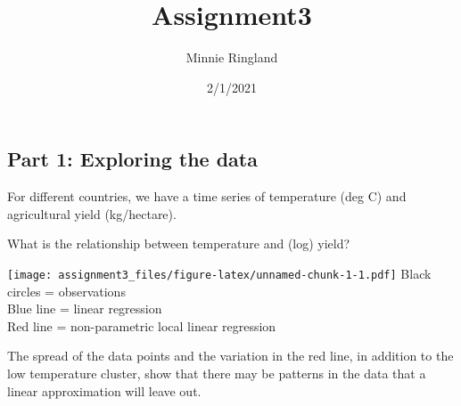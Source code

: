\documentclass[
]{article}
\title{Assignment3}
\author{Minnie Ringland}
\date{2/1/2021}
\newenvironment{Shaded}{\begin{snugshade}}{\end{snugshade}}
\newcommand{\AttributeTok}[1]{\textcolor[rgb]{0.77,0.63,0.00}{#1}}
\newcommand{\CommentTok}[1]{\textcolor[rgb]{0.56,0.35,0.01}{\textit{#1}}}
\newcommand{\ConstantTok}[1]{\textcolor[rgb]{0.00,0.00,0.00}{#1}}
\newcommand{\DecValTok}[1]{\textcolor[rgb]{0.00,0.00,0.81}{#1}}
\newcommand{\FunctionTok}[1]{\textcolor[rgb]{0.00,0.00,0.00}{#1}}
\newcommand{\NormalTok}[1]{#1}
\newcommand{\OtherTok}[1]{\textcolor[rgb]{0.56,0.35,0.01}{#1}}
\newcommand{\SpecialCharTok}[1]{\textcolor[rgb]{0.00,0.00,0.00}{#1}}
\newcommand{\StringTok}[1]{\textcolor[rgb]{0.31,0.60,0.02}{#1}}
\begin{document}
\maketitle

\hypertarget{part-1-exploring-the-data}{%
\subsection{Part 1: Exploring the
data}\label{part-1-exploring-the-data}}

For different countries, we have a time series of temperature (deg C)
and agricultural yield (kg/hectare).

What is the relationship between temperature and (log) yield?

\begin{Shaded}
\end{Shaded}

\texttt{[image: assignment3\_files/figure-latex/unnamed-chunk-1-1.pdf]}
Black circles = observations\\
Blue line = linear regression\\
Red line = non-parametric local linear regression

The spread of the data points and the variation in the red line, in
addition to the low temperature cluster, show that there may be patterns
in the data that a linear approximation will leave out.
\end{document}
